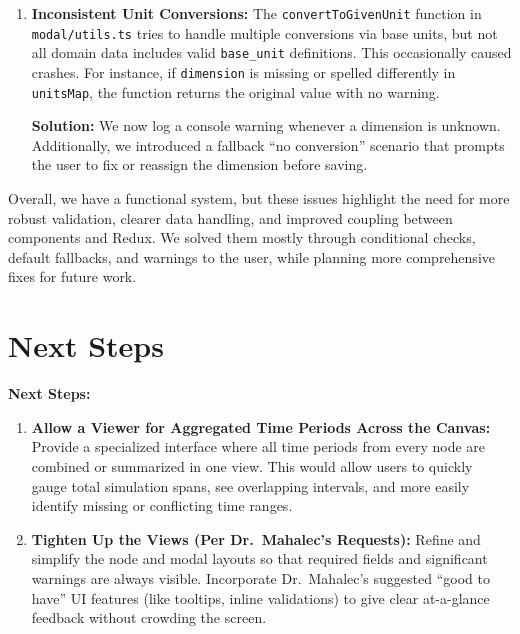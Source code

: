 \documentclass{article}
\begin{document}
\begin{enumerate}
  \textbf{Solution:} We added UI checks that force the user to select at least one model version whenever a time period is created. If none is chosen, the code defaults to a “base” model version or displays a warning.

  \item \textbf{Inconsistent Unit Conversions:}
  The \texttt{convertToGivenUnit} function in \texttt{modal/utils.ts} tries to handle multiple conversions via base units, but not all domain data includes valid \texttt{base\_unit} definitions. This occasionally caused crashes. For instance, if \texttt{dimension} is missing or spelled differently in \texttt{unitsMap}, the function returns the original value with no warning. 

  \textbf{Solution:} We now log a console warning whenever a dimension is unknown. Additionally, we introduced a fallback “no conversion” scenario that prompts the user to fix or reassign the dimension before saving.
\end{enumerate}

Overall, we have a functional system, but these issues highlight the need for more robust validation, clearer data handling, and improved coupling between components and Redux. We solved them mostly through conditional checks, default fallbacks, and warnings to the user, while planning more comprehensive fixes for future work.



\section{Next Steps}

\textbf{Next Steps:}
\begin{enumerate}
  \item \textbf{Allow a Viewer for Aggregated Time Periods Across the Canvas:}  
    Provide a specialized interface where all time periods from every node are combined or summarized in one view. This would allow users to quickly gauge total simulation spans, see overlapping intervals, and more easily identify missing or conflicting time ranges.

  \item \textbf{Tighten Up the Views (Per Dr.\ Mahalec’s Requests):}  
    Refine and simplify the node and modal layouts so that required fields and significant warnings are always visible. Incorporate Dr.\ Mahalec’s suggested “good to have” UI features (like tooltips, inline validations) to give clear at-a-glance feedback without crowding the screen.
\end{enumerate}
\end{document}
